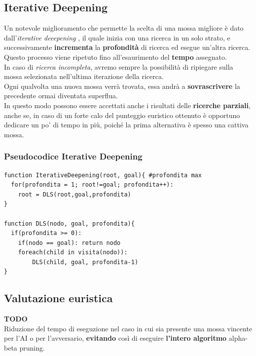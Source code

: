 \documentclass{article}
\begin{document}
    \subsection{Iterative Deepening}
    Un notevole miglioramento che permette la scelta di una mossa migliore è dato dall'\textit{iterative deeepening} \cite{Iterative_Deepening}, il quale inizia con una ricerca in un solo strato, e successivamente \textbf{incrementa} la \textbf{profondità} di ricerca ed esegue un'altra ricerca.\\ Questo processo viene ripetuto fino all'esaurimento del \textbf{tempo} assegnato.\\ In caso di \textit{ricerca incompleta}, avremo sempre la possibilità di ripiegare sulla mossa selezionata nell'ultima iterazione della ricerca. \\
    Ogni qualvolta una nuova mossa verrà trovata, essa andrà a \textbf{sovrascrivere} la precedente ormai diventata superflua.\\
    In questo modo possono essere accettati anche i risultati delle \textbf{ricerche parziali}, anche se, in caso di un forte calo del punteggio euristico ottenuto è opportuno dedicare un po' di tempo in più, poiché la prima alternativa è spesso una cattiva mossa.
    
    
    
        \subsubsection{Pseudocodice Iterative Deepening}
    \lstset{language=java, numbers=left,numbersep=8pt,  }
    \begin{lstlisting}[frame=single]  
function IterativeDeepening(root, goal){ #profondita max
  for(profondita = 1; root!=goal; profondita++):
    root = DLS(root,goal,profondita) 
}

function DLS(nodo, goal, profondita){
  if(profondita >= 0):
    if(nodo == goal): return nodo
    foreach(child in visita(nodo)):
        DLS(child, goal, profondita-1)
}
    \end{lstlisting}
    


    \subsection{Valutazione euristica}
    \textbf{TODO}\\
    
    Riduzione del tempo di eseguzione nel caso in cui sia presente una mossa vincente per l'AI o per l'avversario, \textbf{evitando} così di eseguire \textbf{l'intero algoritmo} alpha-beta pruning. 
\end{document}

